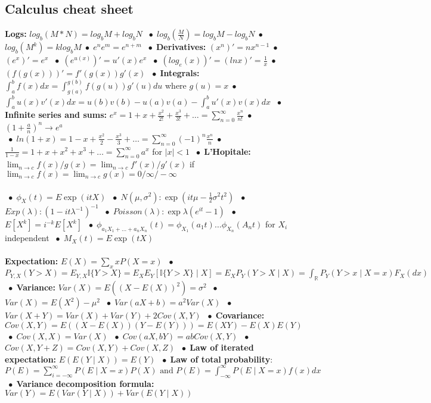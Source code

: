 \documentclass[9pt]{extarticle}
\newcommand{\abs}[1]{\lvert#1\rvert}
\newcommand*\bspace{$\; \bullet \;$}
\begin{document}
\subsection{Calculus cheat sheet}
\textbf{Logs:} $log_b(M * N) = log_bM + log_bN$ \bspace $log_b(\frac{M}{N}) = log_bM - log_bN$\bspace $log_b(M^k) = klog_bM$\bspace $e^ne^m = e^{n+m}$ \bspace \textbf{Derivatives:} $(x^n)' = nx^{n-1}$\bspace $(e^x)' = e^x$ \bspace $(e^{u(x)})' = u'(x)e^x$ \bspace $(log_e(x))' = (lnx)' = \frac{1}{x}$\bspace $(f(g(x)))' = f'(g(x))g'(x)$ \bspace \textbf{Integrals: } $\int_a^b f(x)dx = \int_{g(a)}^{g(b)}f(g(u))g'(u)du$ where $g(u) = x$\bspace $\int_a^b u(x)v'(x)dx = u(b)v(b) - u(a)v(a) - \int_a^b u'(x)v(x)dx$ \bspace \textbf{Infinite series and sums:} $e^x = 1 + x + \frac{x^2}{2!} + \frac{x^3}{3!} + \dots = \sum_{n=0}^\infty \frac{x^n}{n!}$\bspace $(1 + \frac{a}{n})^n \longrightarrow e^a$\\
\bspace $ln(1 + x) = 1 - x + \frac{x^2}{2} - \frac{x^3}{3} + \dots = \sum_{n=0}^\infty (-1)^n\frac{x^n}{n}$\bspace $\frac{1}{1-x} = 1 + x + x^2 + x^3 + \dots = \sum_{n=0}^\infty a^x$ for $\abs{x} < 1$ \bspace \textbf{L'Hopitale:} $\lim_{n\rightarrow c} f(x) / g(x) = \lim_{n\rightarrow c} f'(x)/g'(x)$ if $\lim_{n\rightarrow c} f(x) = \lim_{n\rightarrow c} g(x) = 0/\infty/-\infty$\\\\
\bspace $\phi_X(t) = E \exp(itX)$ \bspace $N(\mu, \sigma^2): \exp(it\mu - \frac{1}{2}\sigma^2t^2)$ \bspace $Exp(\lambda): (1 - it\lambda ^{-1})^{-1}$ \bspace $Poisson(\lambda): \exp{\lambda(e^{it} - 1)}$ \bspace $E[X^k] = i^{-k}E[X^k]$ \bspace $\phi_{a_1X_1 + \dots + a_nX_n}(t) = \phi_{X_1}(a_1t) \dots \phi_{X_n}(A_nt)$ for $X_i$ independent \bspace $M_X(t) = E\exp(tX)$\\\\
\textbf{Expectation:} $E(X) = \sum_x xP(X=x)$ \bspace $P_{Y,X}(Y > X) = E_{Y,X}\mathbb{I}\{Y>X\} = E_XE_Y[\mathbb{I}\{Y>X\} \mid X] = E_XP_Y(Y > X \mid X) = \int_\mathbb{R}P_Y(Y > x \mid X = x)F_X(dx)$ \bspace \textbf{Variance: } $Var(X) = E((X - E(X))^2) = \sigma^2$ \bspace $Var(X) = E(X^2) - \mu^2$ \bspace $Var(aX+b) = a^2Var(X)$ \bspace $Var(X + Y) = Var(X) + Var(Y) + 2Cov(X, Y)$ \bspace \textbf{Covariance: } $Cov(X, Y) = E((X - E(X))(Y - E(Y))) = E(XY) - E(X)E(Y)$ \bspace $Cov(X, X) = Var(X)$ \bspace $Cov(aX, bY) = abCov(X, Y)$ \bspace $Cov(X, Y+Z) = Cov(X, Y) + Cov(X, Z)$ \bspace \textbf{Law of iterated expectation: } $E(E(Y\mid X)) = E(Y)$ \bspace \textbf{Law of total probability}: $P(E) = \sum_{i=-\infty}^\infty P(E \mid X = x)P(X) \textrm{ and } P(E) = \int_{-\infty}^\infty P(E \mid X=x)f(x)dx$ \bspace \textbf{Variance decomposition formula: } $Var(Y) = E(Var(Y\mid X)) + Var(E(Y \mid X))$\\\\
\end{document}
